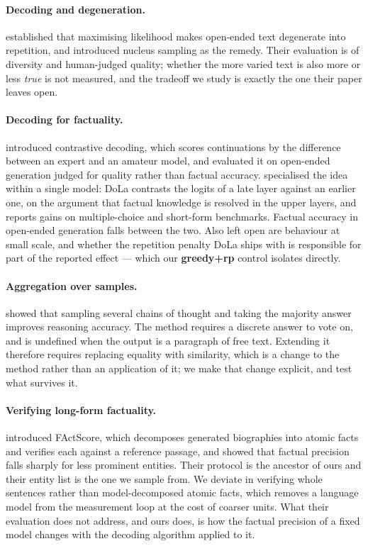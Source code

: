 \documentclass[11pt]{article}
\begin{document}
\paragraph{Decoding and degeneration.}
\citet{holtzman2020curious} established that maximising likelihood makes
open-ended text degenerate into repetition, and introduced nucleus sampling as
the remedy. Their evaluation is of diversity and human-judged quality; whether
the more varied text is also more or less \emph{true} is not measured, and the
tradeoff we study is exactly the one their paper leaves open.

\paragraph{Decoding for factuality.}
\citet{li2023contrastive} introduced contrastive decoding, which scores
continuations by the difference between an expert and an amateur model, and
evaluated it on open-ended generation judged for quality rather than factual
accuracy. \citet{chuang2024dola} specialised the idea within a single model:
DoLa contrasts the logits of a late layer against an earlier one, on the
argument that factual knowledge is resolved in the upper layers, and reports
gains on multiple-choice and short-form benchmarks. Factual accuracy in
open-ended generation falls between the two. Also left open are behaviour at
small scale, and whether the repetition penalty DoLa ships with is responsible
for part of the reported effect --- which our \textbf{greedy+rp} control
isolates directly.

\paragraph{Aggregation over samples.}
\citet{wang2023selfconsistency} showed that sampling several chains of thought
and taking the majority answer improves reasoning accuracy. The method requires
a discrete answer to vote on, and is undefined when the output is a paragraph
of free text. Extending it therefore requires replacing equality with
similarity, which is a change to the method rather than an application of it;
we make that change explicit, and test what survives it.

\paragraph{Verifying long-form factuality.}
\citet{min2023factscore} introduced FActScore, which decomposes generated
biographies into atomic facts and verifies each against a reference passage,
and showed that factual precision falls sharply for less prominent entities.
Their protocol is the ancestor of ours and their entity list is the one we
sample from. We deviate in verifying whole sentences rather than
model-decomposed atomic facts, which removes a language model from the
measurement loop at the cost of coarser units. What their evaluation does not
address, and ours does, is how the factual precision of a fixed model changes
with the decoding algorithm applied to it.
\end{document}
